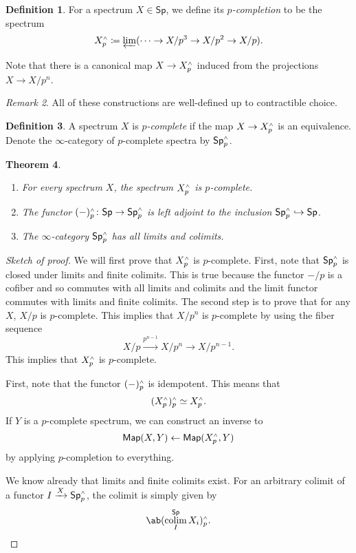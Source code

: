 \documentclass[10pt]{amsart}
\newtheorem{thm}{Theorem}[subsection]
\theoremstyle{definition}
\newtheorem{defn}[thm]{Definition}
\theoremstyle{remark}
\newtheorem{rmk}[thm]{Remark}
\theoremstyle{plain}
\theoremstyle{definition}
\theoremstyle{remark}
\newcommand{\ms}[1]{\mathsf{#1}}
\newcommand{\1}{\mathbf{1}}
\newcommand{\2}{\mathbf{2}}
\newcommand{\3}{\mathbf{3}}
\newcommand{\sw}{\mathsmaller{\wedge}}
\DeclareMathOperator*{\colim}{colim}
\begin{document}
\begin{defn}
    For a spectrum $X \in \ms{Sp}$, we define its \textit{$p$-completion} to be the spectrum
    \[ X_p^{\sw} \coloneqq \varprojlim (\cdots \to X/p^3 \to X/p^2 \to X/p). \]
\end{defn}
Note that there is a canonical map $X \to X_p^{\sw}$ induced from the projections $X \to X/p^n$.

\begin{rmk}
    All of these constructions are well-defined up to contractible choice.
\end{rmk}

\begin{defn}
    A spectrum $X$ is \textit{$p$-complete} if the map $X \to X_p^{\sw}$ is an equivalence. Denote the $\infty$-category of $p$-complete spectra by $\ms{Sp}_p^{\sw}$.
\end{defn}

\begin{thm}\leavevmode
    \begin{enumerate}
        \item For every spectrum $X$, the spectrum $X_p^{\sw}$ is $p$-complete.
        \item The functor $(-)_p^{\sw} \colon \ms{Sp} \to \ms{Sp}_p^{\sw}$ is left adjoint to the inclusion $\ms{Sp}_p^{\sw} \hookrightarrow \ms{Sp}$.
        \item The $\infty$-category $\ms{Sp}_p^{\sw}$ has all limits and colimits.
    \end{enumerate}
\end{thm}

\begin{proof}[Sketch of proof]
    We will first prove that $X_p^{\sw}$ is $p$-complete. First, note that $\ms{Sp}_p^{\sw}$ is closed under limits and finite colimits. This is true because the functor $-/p$ is a cofiber and so commutes with all limits and colimits and the limit functor commutes with limits and finite colimits. The second step is to prove that for any $X$, $X/p$ is $p$-complete. This implies that $X/p^n$ is $p$-complete by using the fiber sequence
    \[ X/p \xrightarrow{p^{n-1}} X/p^n \to X/p^{n-1}. \]
    This implies that $X_p^{\sw}$ is $p$-complete.

    First, note that the functor $(-)_p^{\sw}$ is idempotent. This means that
    \[ (X_p^{\sw})_p^{\sw} \simeq X_p^{\sw}. \]
    If $Y$ is a $p$-complete spectrum, we can construct an inverse to
    \[ \ms{Map}(X, Y) \gets \ms{Map}(X_p^{\sw}, Y) \]
    by applying $p$-completion to everything.

    We know already that limits and finite colimits exist. For an arbitrary colimit of a functor $I \xrightarrow{X} \ms{Sp}_p^{\sw}$, the colimit is simply given by
    \[ \ab(\colim_I^{\ms{Sp}} X_i)_p^{\sw}. \qedhere \]
\end{proof}
\end{document}
